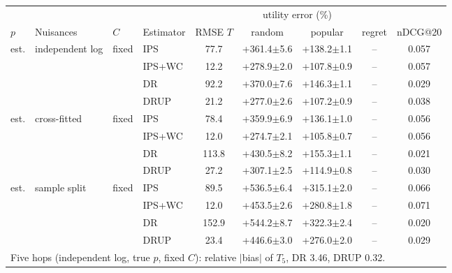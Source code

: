 \begin{tabular}{llllccccc}
\toprule
 & & & & & \multicolumn{2}{c}{utility error (\%)} & & \\
$p$ & Nuisances & $C$ & Estimator & RMSE $T$ & random & popular & regret & nDCG@20\\
\midrule
est. & independent log & fixed & IPS & 77.7 & +361.4$\pm$5.6 & +138.2$\pm$1.1 & -- & 0.057\\
 &  &  & IPS+WC & 12.2 & +278.9$\pm$2.0 & +107.8$\pm$0.9 & -- & 0.057\\
 &  &  & DR & 92.2 & +370.0$\pm$7.6 & +146.3$\pm$1.1 & -- & 0.029\\
 &  &  & DRUP & 21.2 & +277.0$\pm$2.6 & +107.2$\pm$0.9 & -- & 0.038\\
\midrule
est. & cross-fitted & fixed & IPS & 78.4 & +359.9$\pm$6.9 & +136.1$\pm$1.0 & -- & 0.056\\
 &  &  & IPS+WC & 12.0 & +274.7$\pm$2.1 & +105.8$\pm$0.7 & -- & 0.056\\
 &  &  & DR & 113.8 & +430.5$\pm$8.2 & +155.3$\pm$1.1 & -- & 0.021\\
 &  &  & DRUP & 27.2 & +307.1$\pm$2.5 & +114.9$\pm$0.8 & -- & 0.030\\
\midrule
est. & sample split & fixed & IPS & 89.5 & +536.5$\pm$6.4 & +315.1$\pm$2.0 & -- & 0.066\\
 &  &  & IPS+WC & 12.0 & +453.5$\pm$2.6 & +280.8$\pm$1.8 & -- & 0.071\\
 &  &  & DR & 152.9 & +544.2$\pm$8.7 & +322.3$\pm$2.4 & -- & 0.020\\
 &  &  & DRUP & 23.4 & +446.6$\pm$3.0 & +276.0$\pm$2.0 & -- & 0.029\\
\midrule
\multicolumn{9}{l}{Five hops (independent log, true $p$, fixed $C$): relative $|$bias$|$ of $T_5$, DR 3.46, DRUP 0.32.}\\
\bottomrule
\end{tabular}
